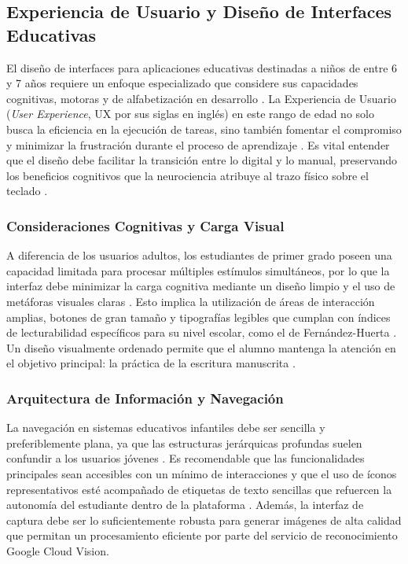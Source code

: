 \subsection{Experiencia de Usuario y Diseño de Interfaces Educativas}

El diseño de interfaces para aplicaciones educativas destinadas a niños de entre 6 y 7 años requiere un enfoque especializado que considere sus capacidades cognitivas, motoras y de alfabetización en desarrollo \cite{gelman2014design, nngroup2019children}. La Experiencia de Usuario (\textit{User Experience}, UX por sus siglas en inglés) en este rango de edad no solo busca la eficiencia en la ejecución de tareas, sino también fomentar el compromiso y minimizar la frustración durante el proceso de aprendizaje \cite{gelman2014design}. Es vital entender que el diseño debe facilitar la transición entre lo digital y lo manual, preservando los beneficios cognitivos que la neurociencia atribuye al trazo físico sobre el teclado \cite{james2012effects, berninger2010teaching}.

\subsubsection{Consideraciones Cognitivas y Carga Visual}

A diferencia de los usuarios adultos, los estudiantes de primer grado poseen una capacidad limitada para procesar múltiples estímulos simultáneos, por lo que la interfaz debe minimizar la carga cognitiva mediante un diseño limpio y el uso de metáforas visuales claras \cite{nngroup2019children}. Esto implica la utilización de áreas de interacción amplias, botones de gran tamaño y tipografías legibles que cumplan con índices de lecturabilidad específicos para su nivel escolar, como el de Fernández-Huerta \cite{fernandez1959lecturabilidad}. Un diseño visualmente ordenado permite que el alumno mantenga la atención en el objetivo principal: la práctica de la escritura manuscrita \cite{gelman2014design}.

\subsubsection{Arquitectura de Información y Navegación}
La navegación en sistemas educativos infantiles debe ser sencilla y preferiblemente plana, ya que las estructuras jerárquicas profundas suelen confundir a los usuarios jóvenes \cite{gelman2014design}. Es recomendable que las funcionalidades principales sean accesibles con un mínimo de interacciones y que el uso de íconos representativos esté acompañado de etiquetas de texto sencillas que refuercen la autonomía del estudiante dentro de la plataforma \cite{nngroup2019children}. Además, la interfaz de captura debe ser lo suficientemente robusta para generar imágenes de alta calidad que permitan un procesamiento eficiente por parte del servicio de reconocimiento Google Cloud Vision.

